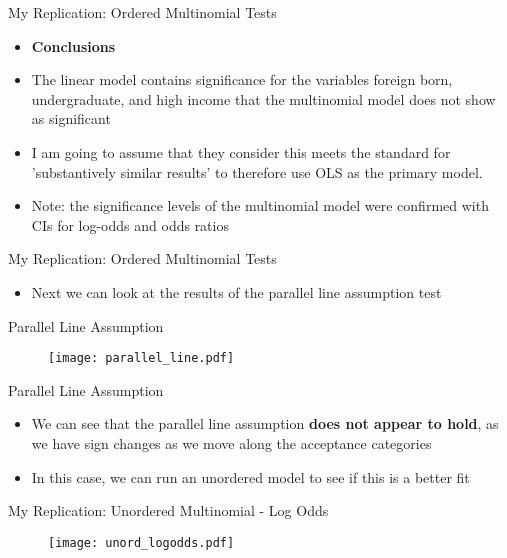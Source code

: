 \documentclass{beamer}
\begin{document}
\begin{frame}{My Replication: Ordered Multinomial Tests}
	\begin{itemize}
		\item \textbf{Conclusions}
		\item The linear model contains significance for the variables foreign born, undergraduate, and high income that the multinomial model does not show as significant
		\item I am going to assume that they consider this meets the standard for 'substantively similar results' to therefore use OLS as the primary model.  
		\item Note: the significance levels of the multinomial model were confirmed with CIs for log-odds and odds ratios
	\end{itemize}
\end{frame}

\begin{frame}{My Replication: Ordered Multinomial Tests}
	\begin{itemize}
		\item Next we can look at the results of the parallel line assumption test
	\end{itemize}
\end{frame}

\begin{frame}{Parallel Line Assumption}
	\vspace{-1.4cm}
	\begin{figure}[htbp]
		\centering
		\texttt{[image: parallel\_line.pdf]} %
		\label{fig:intercepts}
	\end{figure}
\end{frame}

\begin{frame}{Parallel Line Assumption}
	\begin{itemize}
		\item We can see that the parallel line assumption \textbf{does not appear to hold}, as we have sign changes as we move along the acceptance categories
		\item In this case, we can run an unordered model to see if this is a better fit
	\end{itemize}
\end{frame}




		 

\begin{frame}{My Replication: Unordered Multinomial - Log Odds}
	\vspace{-1.4cm}
	\begin{figure}[htbp]
		\centering
		\texttt{[image: unord\_logodds.pdf]} %
		\label{fig:intercepts}
	\end{figure}
\end{frame}
\end{document}
